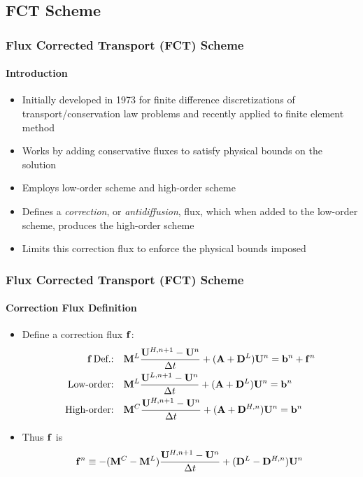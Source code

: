 \documentclass{beamer}
\begin{document}
\subsection{FCT Scheme}
\begin{frame}
\frametitle{Flux Corrected Transport (FCT) Scheme}
\framesubtitle{Introduction}

\begin{itemize}
   \item Initially developed in 1973 for finite difference discretizations of
      transport/conservation law problems and recently applied to finite element method
   \item Works by adding conservative fluxes to satisfy physical bounds on the solution
   \item Employs low-order scheme and high-order scheme
   \item Defines a \emph{correction}, or \emph{antidiffusion}, flux, which
      when added to the low-order scheme, produces the high-order scheme
   \item Limits this correction flux to enforce the physical bounds imposed
\end{itemize}

\end{frame}
\begin{frame}
\frametitle{Flux Corrected Transport (FCT) Scheme}
\framesubtitle{Correction Flux Definition}

\begin{itemize}
   \item Define a correction flux $\mathbf{f}$:
   \begin{align*}
      \mathbf{f}\,\mbox{Def.:}\quad   & \mathbf{M}^L\frac{\mathbf{U}^{H,n+1}-\mathbf{U}^n}{\Delta t}+(\mathbf{A}+\mathbf{D}^L)\mathbf{U}^n = \mathbf{b}^n + \mathbf{f}^n\\
      \mbox{Low-order:}\quad  & \mathbf{M}^L\frac{\mathbf{U}^{L,n+1}-\mathbf{U}^n}{\Delta t}+(\mathbf{A} + \mathbf{D}^L)\mathbf{U}^n = \mathbf{b}^n\\
      \mbox{High-order:}\quad & \mathbf{M}^C\frac{\mathbf{U}^{H,n+1}-\mathbf{U}^n}{\Delta t}+(\mathbf{A} + \mathbf{D}^{H,n})\mathbf{U}^n = \mathbf{b}^n
   \end{align*}
   \item Thus $\mathbf{f}$ is
   \begin{equation}
      \mathbf{f}^n \equiv -(\mathbf{M}^C-\mathbf{M}^L)\frac{\mathbf{U}^{H,n+1}-\mathbf{U}^n}{\Delta t} +(\mathbf{D}^L-\mathbf{D}^{H,n})\mathbf{U}^n
   \end{equation}
\end{itemize}

\end{frame}
\end{document}
